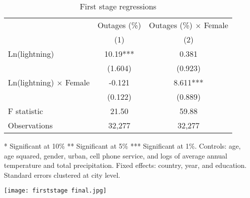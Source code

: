 \documentclass[12pt]{article}
\begin{document}
\begin{table}[htbp]
  \begin{adjustwidth}{-0.4in}{-0.4in}
  \centering
  \footnotesize
  \begin{minipage}[t]{0.60\textwidth}
    \vspace{5pt}
    \centering
    \caption{First stage regressions}
    \label{tab:firststagereg}
    \begin{tabular}{l c c}
        \hline\hline
        \centering
        & Outages (\%) & Outages (\%) $\times$ Female \\
        \cline{2-3}
        & (1) & (2) \\
        \hline
        Ln(lightning) & 10.19*** & 0.381\\
        & (1.604)& (0.923)\\
        Ln(lightning) $\times$ Female & -0.121& 8.611***\\
        & (0.122)& (0.889)\\
        \hline
        F statistic & 21.50&  59.88\\
        Observations     &   32,277   &  32,277   \\
        \hline
        \end{tabular}
        \begin{flushleft}
        \scriptsize
        * Significant at 10\% ** Significant at 5\% *** Significant at 1\%. Controls: age, age squared, gender, urban, cell phone service, and logs of average annual temperature and total precipitation. Fixed effects: country, year, and education. Standard errors clustered at city level.
        \end{flushleft}
  \end{minipage}
  \hfill
  \begin{minipage}[t]{0.49\textwidth}
    \vspace{0pt}
    \centering
    \texttt{[image: firststage final.jpg]}
  \end{minipage}
    \end{adjustwidth}
\end{table}
\end{document}
